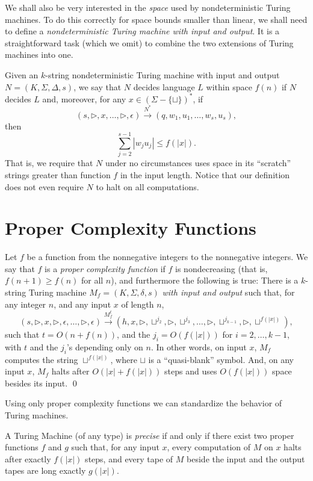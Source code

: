 \documentclass[12pt]{article}
\newcommand{\blank}{\sqcup}
\begin{document}
We shall also be very interested in the \textit{space} used by nondeterministic 
Turing machines. To do this correctly for space bounds smaller than linear, we 
shall need to define a \textit{nondeterministic Turing machine with input and output}. 
It is a straightforward task (which we omit) to combine the two extensions of 
Turing machines into one.

Given an $k$-string nondeterministic Turing machine with input and output 
$N = (K, \Sigma, \Delta, s)$, we say that $N$ decides language $L$ within space $f(n)$ if 
$N$ decides $L$ and, moreover, for any $x \in (\Sigma - \{\blank\})^*$, if 
\[
(s, \triangleright, x, \ldots, \triangleright, \epsilon) \xrightarrow{N^*} (q, w_1, u_1, \ldots, w_s, u_s),
\]
then 
\[
\sum_{j=2}^{s-1} |w_j u_j| \leq f(|x|).
\]
That is, we require that $N$ under no circumstances uses space in its ``scratch'' strings greater than function $f$ in the input length. Notice that our definition does not even require $N$ to halt on all computations.

\section{Proper Complexity Functions}
\begin{defbox}
  Let $f$ be a function from the nonnegative 
integers to the nonnegative integers. We say that $f$ is a \textit{proper complexity 
function} if $f$ is nondecreasing (that is, $f(n+1) \geq f(n)$ for all $n$), and furthermore 
the following is true: There is a $k$-string Turing machine $M_f = (K, \Sigma, \delta, s)$ 
\textit{with input and output} such that, for any integer $n$, and any input $x$ of length 
$n$, 
\[
(s, \triangleright, x, \triangleright, \epsilon, \ldots, \triangleright, \epsilon) 
\xrightarrow{M_f^t} 
(h, x, \triangleright, \sqcup^{j_2}, \triangleright, \sqcup^{j_3}, \ldots, 
\triangleright, \sqcup^{j_{k-1}}, \triangleright, \sqcup^{f(|x|)}),
\]
such that $t = O(n + f(n))$, and the $j_i = O(f(|x|))$ for $i = 2, \ldots, k - 1$, with $t$ and the 
$j_i$'s depending only on $n$. In other words, on input $x$, $M_f$ computes the string 
$\sqcup^{f(|x|)}$, where $\sqcup$ is a ``quasi-blank'' symbol. And, on any input $x$, $M_f$ halts after 
$O(|x| + f(|x|))$ steps and uses $O(f(|x|))$ space besides its input. \qed
\end{defbox}
Using only proper complexity functions we can standardize the behavior of Turing machines.
\begin{defbox}
  A Turing Machine (of any type) is \textit{precise} if and only if there exist two proper functions $f$ and $g$ such that, for any input $x$, every computation of $M$ on $x$ halts after exactly $f(|x|)$ steps, and every tape of $M$ beside the input and the output tapes are long exactly $g(|x|)$.
  
\end{defbox}
\end{document}
